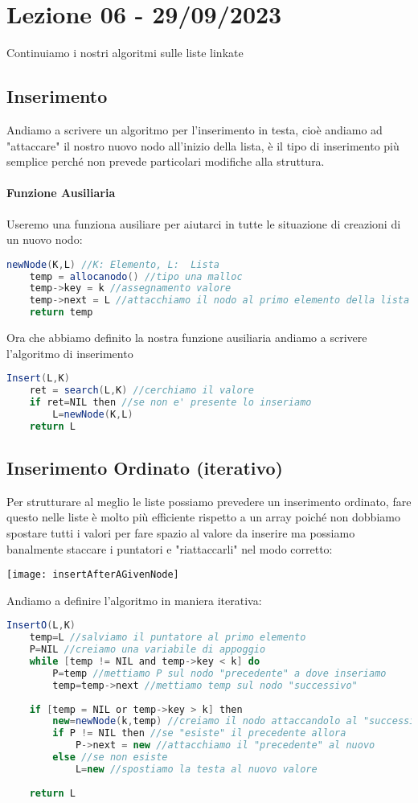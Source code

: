 \section{Lezione 06 - 29/09/2023}
Continuiamo i nostri algoritmi sulle liste linkate
\subsection{Inserimento}
Andiamo a scrivere un algoritmo per l'inserimento in testa, cioè andiamo ad "attaccare" il nostro nuovo nodo all'inizio della lista, è il tipo di inserimento più semplice perché non prevede particolari modifiche alla struttura.
\paragraph{Funzione Ausiliaria} Useremo una funziona ausiliare per aiutarci in tutte le situazione di creazioni di un nuovo nodo:
\begin{lstlisting}[language=Java]
newNode(K,L) //K: Elemento, L:  Lista
	temp = allocanodo() //tipo una malloc
	temp->key = k //assegnamento valore
	temp->next = L //attacchiamo il nodo al primo elemento della lista in input
	return temp
\end{lstlisting}
Ora che abbiamo definito la nostra funzione ausiliaria andiamo a scrivere l'algoritmo di inserimento
\begin{lstlisting}[language=Java]
Insert(L,K)
	ret = search(L,K) //cerchiamo il valore
	if ret=NIL then //se non e' presente lo inseriamo
		L=newNode(K,L)
	return L
\end{lstlisting}

\subsection{Inserimento Ordinato (iterativo)}
Per strutturare al meglio le liste possiamo prevedere un inserimento ordinato, fare questo nelle liste è molto più efficiente rispetto a un array poiché non dobbiamo spostare tutti i valori per fare spazio al valore da inserire ma possiamo banalmente staccare i puntatori e "riattaccarli" nel modo corretto:
\begin{center}
\texttt{[image: insertAfterAGivenNode]}
\end{center}
\newpage
Andiamo a definire l'algoritmo in maniera iterativa:
\begin{lstlisting}[language=Java]
InsertO(L,K)
	temp=L //salviamo il puntatore al primo elemento
	P=NIL //creiamo una variabile di appoggio
	while [temp != NIL and temp->key < k] do 
		P=temp //mettiamo P sul nodo "precedente" a dove inseriamo
		temp=temp->next //mettiamo temp sul nodo "successivo"
		
	if [temp = NIL or temp->key > k] then
		new=newNode(k,temp) //creiamo il nodo attaccandolo al "successivo"
		if P != NIL then //se "esiste" il precedente allora
			P->next = new //attacchiamo il "precedente" al nuovo
		else //se non esiste
			L=new //spostiamo la testa al nuovo valore 
			
	return L 	
\end{lstlisting}

